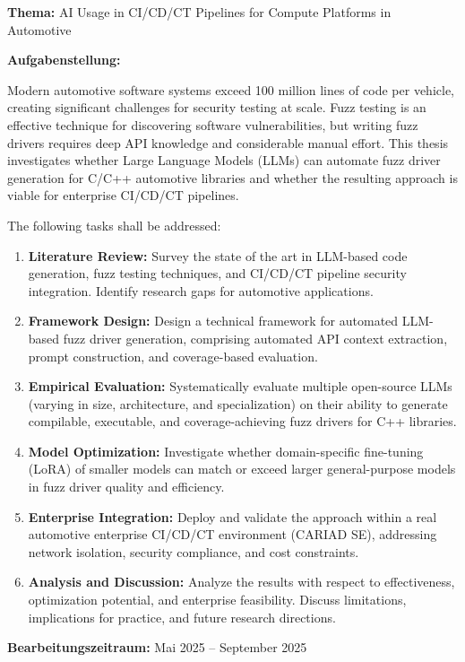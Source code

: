 
\textbf{Thema:} AI Usage in CI/CD/CT Pipelines for Compute Platforms in Automotive

\vspace{0.5cm}

\textbf{Aufgabenstellung:}

Modern automotive software systems exceed 100 million lines of code per vehicle, creating significant challenges for security testing at scale. Fuzz testing is an effective technique for discovering software vulnerabilities, but writing fuzz drivers requires deep API knowledge and considerable manual effort. This thesis investigates whether Large Language Models (LLMs) can automate fuzz driver generation for C/C++ automotive libraries and whether the resulting approach is viable for enterprise CI/CD/CT pipelines.

The following tasks shall be addressed:

\begin{enumerate}
    \item \textbf{Literature Review:} Survey the state of the art in LLM-based code generation, fuzz testing techniques, and CI/CD/CT pipeline security integration. Identify research gaps for automotive applications.

    \item \textbf{Framework Design:} Design a technical framework for automated LLM-based fuzz driver generation, comprising automated API context extraction, prompt construction, and coverage-based evaluation.

    \item \textbf{Empirical Evaluation:} Systematically evaluate multiple open-source LLMs (varying in size, architecture, and specialization) on their ability to generate compilable, executable, and coverage-achieving fuzz drivers for C++ libraries.

    \item \textbf{Model Optimization:} Investigate whether domain-specific fine-tuning (LoRA) of smaller models can match or exceed larger general-purpose models in fuzz driver quality and efficiency.

    \item \textbf{Enterprise Integration:} Deploy and validate the approach within a real automotive enterprise CI/CD/CT environment (CARIAD SE), addressing network isolation, security compliance, and cost constraints.

    \item \textbf{Analysis and Discussion:} Analyze the results with respect to effectiveness, optimization potential, and enterprise feasibility. Discuss limitations, implications for practice, and future research directions.
\end{enumerate}

\vspace{0.5cm}
\noindent\textbf{Bearbeitungszeitraum:} Mai 2025 -- September 2025
